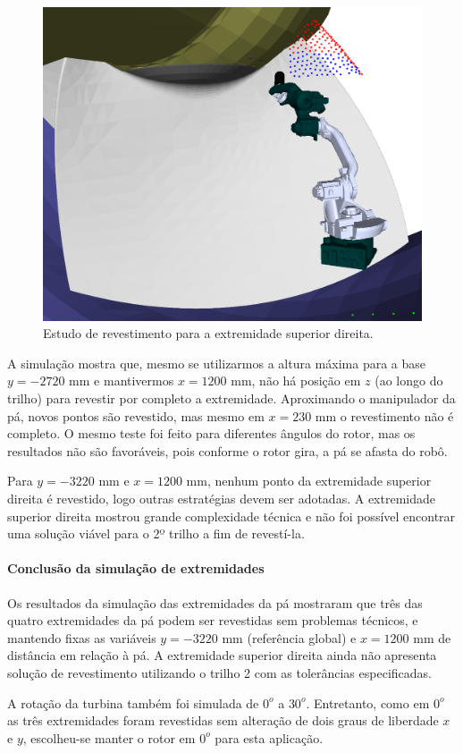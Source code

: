 \begin{figure}[!ht]
	\centering	
	\includegraphics[width=.5\columnwidth]{figs/shoulderright.png}
	\caption{Estudo de revestimento para a extremidade superior direita.}
	\label{fig::shoulderright}
\end{figure}

A simulação mostra que, mesmo se utilizarmos a altura máxima para a base
$y=-2720$ mm e mantivermos $x=1200$ mm, não há posição em $z$ (ao longo do
trilho) para revestir por completo a extremidade. Aproximando o manipulador da
pá, novos pontos são revestido, mas mesmo em $x=230$ mm o
revestimento não é completo. O mesmo teste foi feito para diferentes
ângulos do rotor, mas os resultados não são favoráveis, pois conforme o rotor
gira, a pá se afasta do robô.

Para $y=-3220$ mm e $x=1200$ mm, nenhum ponto da extremidade superior direita é
revestido, logo outras estratégias devem ser adotadas. A extremidade superior
direita mostrou grande complexidade técnica e não foi possível encontrar uma
solução viável para o 2º trilho a fim de revestí-la.

\paragraph{Conclusão da simulação de extremidades}

Os resultados da simulação das extremidades da pá mostraram que três das
quatro extremidades da pá podem ser revestidas sem problemas técnicos, e
mantendo fixas as variáveis $y=-3220$ mm (referência global) e $x=1200$ mm de
distância em relação à pá. A extremidade superior direita ainda não apresenta
solução de revestimento utilizando o trilho 2 com as tolerâncias especificadas.

A rotação da turbina também foi simulada de $0^o$ a $30^o$. Entretanto, como
em $0^o$ as três extremidades foram revestidas sem alteração de dois graus de
liberdade $x$ e $y$, escolheu-se manter o rotor em $0^o$ para esta aplicação.

